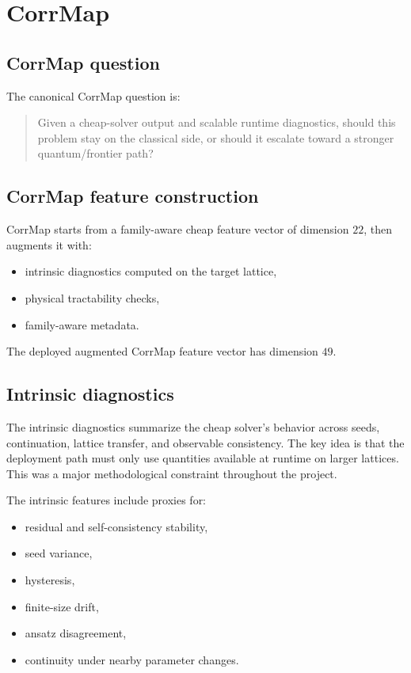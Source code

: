 \documentclass[11pt]{article}
\begin{document}
\section{CorrMap}

\subsection{CorrMap question}

The canonical CorrMap question is:

\begin{quote}
Given a cheap-solver output and scalable runtime diagnostics, should this problem stay on the classical side, or should it escalate toward a stronger quantum/frontier path?
\end{quote}

\subsection{CorrMap feature construction}

CorrMap starts from a family-aware cheap feature vector of dimension \(22\), then augments it with:

\begin{itemize}
\item intrinsic diagnostics computed on the target lattice,
\item physical tractability checks,
\item family-aware metadata.
\end{itemize}

The deployed augmented CorrMap feature vector has dimension \(49\).

\subsection{Intrinsic diagnostics}

The intrinsic diagnostics summarize the cheap solver's behavior across seeds, continuation, lattice transfer, and observable consistency. The key idea is that the deployment path must only use quantities available at runtime on larger lattices. This was a major methodological constraint throughout the project.

The intrinsic features include proxies for:

\begin{itemize}
\item residual and self-consistency stability,
\item seed variance,
\item hysteresis,
\item finite-size drift,
\item ansatz disagreement,
\item continuity under nearby parameter changes.
\end{itemize}
\end{document}

